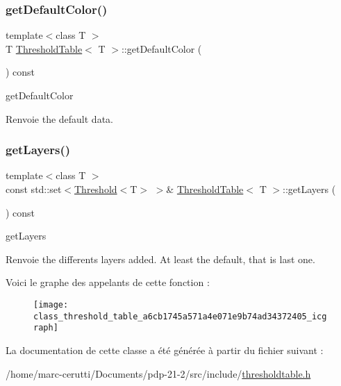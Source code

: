 \subsubsection{\texorpdfstring{get\+Default\+Color()}{getDefaultColor()}}
{\footnotesize\ttfamily template$<$class T $>$ \\
T \hyperlink{class_threshold_table}{Threshold\+Table}$<$ T $>$\+::get\+Default\+Color (\begin{DoxyParamCaption}{ }\end{DoxyParamCaption}) const\hspace{0.3cm}{\ttfamily [inline]}}



get\+Default\+Color 

\begin{DoxyReturn}{Renvoie}
the default data. 
\end{DoxyReturn}
\mbox{\label{class_threshold_table_a6cb1745a571a4e071e9b74ad34372405}} 
\subsubsection{\texorpdfstring{get\+Layers()}{getLayers()}}
{\footnotesize\ttfamily template$<$class T $>$ \\
const std\+::set$<$\hyperlink{struct_threshold}{Threshold}$<$T$>$ $>$\& \hyperlink{class_threshold_table}{Threshold\+Table}$<$ T $>$\+::get\+Layers (\begin{DoxyParamCaption}{ }\end{DoxyParamCaption}) const\hspace{0.3cm}{\ttfamily [inline]}}



get\+Layers 

\begin{DoxyReturn}{Renvoie}
the differents layers added. At least the default, that is last one. 
\end{DoxyReturn}
Voici le graphe des appelants de cette fonction \+:\nopagebreak
\begin{figure}[H]
\begin{center}
\leavevmode
\texttt{[image: class\_threshold\_table\_a6cb1745a571a4e071e9b74ad34372405\_icgraph]}
\end{center}
\end{figure}


La documentation de cette classe a été générée à partir du fichier suivant \+:\begin{DoxyCompactItemize}
\item 
/home/marc-\/cerutti/\+Documents/pdp-\/21-\/2/src/include/\hyperlink{thresholdtable_8h}{thresholdtable.\+h}\end{DoxyCompactItemize}

